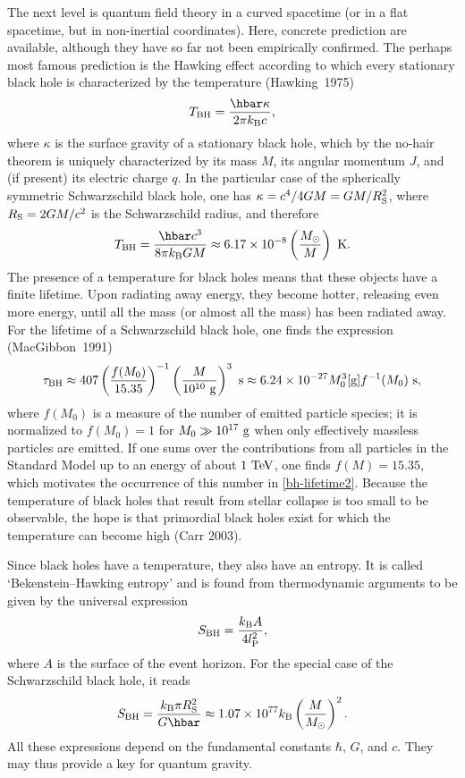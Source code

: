 \documentclass[12pt]{article}
\newcommand{\be}{\begin{equation}}
\newcommand{\ee}{\end{equation}}
\newcommand{\lb}{\label}
\begin{document}
The next level is quantum field theory in a curved spacetime (or in a
flat spacetime, but in non-inertial coordinates). Here, concrete
prediction are available, although they have so far not been
empirically confirmed. The perhaps most famous prediction is the
Hawking effect according to which every stationary black hole is
characterized by the temperature (Hawking~1975)
\be
\lb{TH}
T_{\rm BH}=\frac{\hbar\kappa}{2\pi k_{\rm B}c} ,
\ee
where $\kappa$ is the surface gravity of a stationary black hole, which
by the no-hair theorem is uniquely characterized by its mass $M$,
its angular momentum $J$, and (if present) its electric charge $q$.
In the particular case of the spherically symmetric Schwarzschild 
black hole, one has $\kappa=c^4/4GM=GM/R_{\rm S}^2$, where $R_{\rm
S}=2GM/c^2$ is the Schwarzschild radius, and therefore
\be
\lb{TSchwarz}
T_{\rm BH} =\frac{\hbar c^3}{8\pi k_{\rm B}GM}\approx 6.17\times 10^{-8}
 \left(\frac{M_{\odot}}{M}\right)\ {\rm K} .
\ee
The presence of a temperature for black holes means that these objects
have a finite lifetime. Upon radiating away energy, they become
hotter, releasing even more energy, until all the mass (or almost all
the mass) has been radiated away. For the lifetime
of a Schwarzschild black hole, one finds the expression
(MacGibbon~1991)
\begin{equation}\label{bh-lifetime2}
\tau_\mathrm{BH} \approx 407\left(\frac{f(M_0)}{15.35}\right)^{-1}
\left(\frac{M}{10^{10}\ {\rm g}}\right)^3\ {\rm s}
\approx 6.24\times 10^{-27}M_0^3[{\rm g}]f^{-1}(M_0)\ {\rm s},
\end{equation}
where $f(M_0)$ is a measure of the number of emitted particle species;
it is normalized to
$f(M_0)=1$ for $M_0\gg 10^{17}\ {\rm g}$ when only effectively
massless particles are emitted. If one sums over the contributions
from all particles in the Standard Model up to an energy of about $1\
{\rm TeV}$, one finds $f(M)=15.35$, which motivates the occurrence of
this number in \eqref{bh-lifetime2}. Because the temperature of
 black holes that result 
from stellar collapse is too small to be observable, the hope is that
primordial black holes exist for which the temperature can become high
(Carr 2003).

Since black holes have a temperature, they also have an entropy.
It is called `Bekenstein--Hawking entropy' and is found from
thermodynamic arguments to be given by the universal expression
\begin{equation}\label{SBH}
  S_\mathrm{BH} = \frac{k_\mathrm{B} A}{4 l_{\rm P}^2},
\end{equation}
where $A$ is the surface of the event horizon. 
For the special case of the Schwarzschild black hole, it reads
\begin{equation}\label{SBHSS}
  S_\mathrm{BH} = \frac{k_\mathrm{B} \pi R_{\rm S}^2}{ G \hbar}
  \approx 1.07\times 10^{77}k_\mathrm{B}\left(\frac{M}{M_{\odot}}\right)^2.
\end{equation}
All these expressions depend on the fundamental constants $\hbar$,
$G$, and $c$. They may thus provide a key for quantum
gravity.
\end{document}
